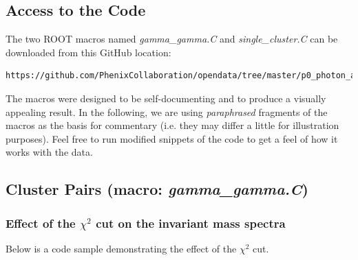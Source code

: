 \documentclass[pdftex,12pt,letter]{article}
\begin{document}
\subsection{Access to the Code}
The two ROOT macros named \textit{gamma\_gamma.C} and
\textit{single\_cluster.C} can be downloaded from this GitHub location:
\begin{verbatim}
https://github.com/PhenixCollaboration/opendata/tree/master/p0_photon_analysis
\end{verbatim}
The macros were designed to be self-documenting and to produce a visually appealing
result.
In the following, we are using {\it paraphrased} fragments of the macros as the basis
for commentary (i.e. they may differ a little for illustration purposes). Feel free to
run modified snippets of the code to get a feel of how it works with the data.

\subsection{Cluster Pairs (macro: \textit{gamma\_gamma.C})}
\subsubsection{Effect of the $\chi^2$ cut on the invariant mass spectra}
Below is a code sample demonstrating the effect of the $\chi^2$ cut.
\end{document}
